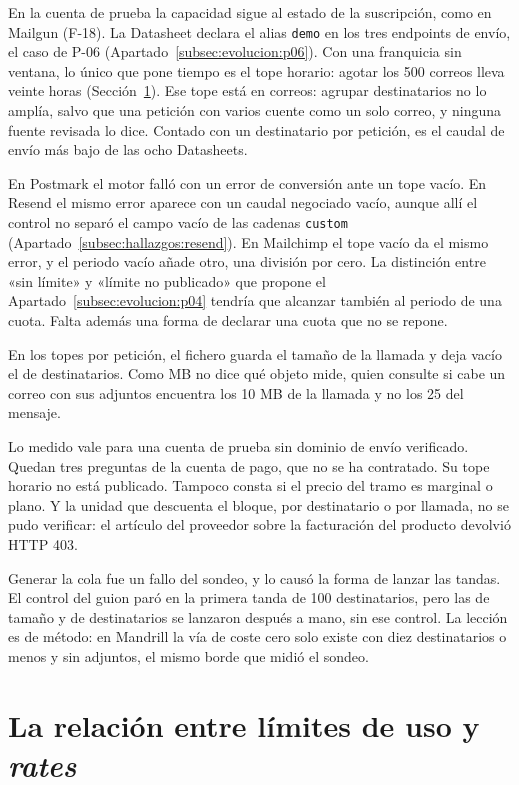 En la cuenta de prueba la capacidad sigue al estado de la suscripción, como en Mailgun
(F-18). La Datasheet declara el alias \texttt{demo} en los tres endpoints de envío,
el caso de P-06 (Apartado~\ref{subsec:evolucion:p06}). Con una
franquicia sin ventana, lo único que pone tiempo es el tope horario: agotar los 500
correos lleva veinte horas (Sección~\ref{sec:hallazgos:limites-rates}). Ese tope está
en correos: agrupar destinatarios no lo amplía, salvo que una petición con varios
cuente como un solo correo, y ninguna fuente revisada lo dice. Contado con un destinatario por petición, es el caudal de envío
más bajo de las ocho Datasheets.

En Postmark el motor falló con un error de conversión ante un tope vacío. En Resend
el mismo error aparece con un caudal negociado vacío, aunque allí el control no
separó el campo vacío de las cadenas \texttt{custom} (Apartado~\ref{subsec:hallazgos:resend}).
En Mailchimp el tope vacío da el mismo error, y el periodo vacío añade otro, una
división por cero. La distinción entre «sin límite» y «límite no publicado» que
propone el Apartado~\ref{subsec:evolucion:p04} tendría que alcanzar también al periodo de una cuota. Falta
además una forma de declarar una cuota que no se repone.

En los topes por petición, el fichero guarda el tamaño de la llamada y deja vacío el
de destinatarios. Como MB no dice qué objeto mide, quien consulte si cabe un correo
con sus adjuntos encuentra los 10 MB de la llamada y no los 25 del mensaje.

Lo medido vale para una cuenta de prueba sin dominio de envío verificado. Quedan
tres preguntas de la cuenta de pago, que no se ha contratado. Su tope horario no
está publicado. Tampoco consta si el precio del tramo es marginal o plano. Y la
unidad que descuenta el bloque, por destinatario o por llamada, no se pudo
verificar: el artículo del proveedor sobre la facturación del producto devolvió HTTP
403.

Generar la cola fue un fallo del sondeo, y lo causó la forma de lanzar las tandas. El
control del guion paró en la primera tanda de 100 destinatarios, pero las de tamaño y
de destinatarios se lanzaron después a mano, sin ese control. La lección es de método:
en Mandrill la vía de coste cero solo existe con diez destinatarios o menos y sin
adjuntos, el mismo borde que midió el sondeo.

\section{La relación entre límites de uso y \textit{rates}}
\label{sec:hallazgos:limites-rates}


